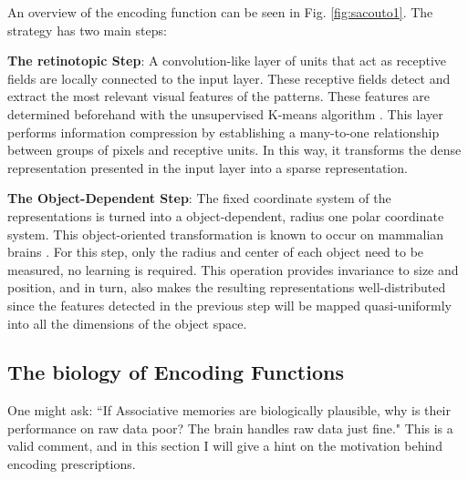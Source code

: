\documentclass[runningheads]{llncs}
\begin{document}
An overview of the encoding function can be seen in Fig. \ref{fig:sacouto1}. The strategy has two main steps:

\textbf{The retinotopic Step}: A convolution-like layer \cite{lecun1995convolutional} of units that act as receptive fields are locally connected to the input layer. These receptive fields detect and extract the most relevant visual features of the patterns. These features are determined beforehand with the unsupervised K-means algorithm \cite{lloyd1982least,wu2008top}. This layer performs information compression by establishing a many-to-one relationship between groups of pixels and receptive units. In this way, it transforms the dense representation presented in the input layer into a sparse representation.

\textbf{The Object-Dependent Step}: The fixed coordinate system of the representations is turned into a object-dependent, radius one polar coordinate system. This object-oriented transformation is known to occur on mammalian brains \cite{chafee2007representing}. For this step, only the radius and center of each object need to be measured, no learning is required. This operation provides invariance to size and position, and in turn, also makes the resulting representations well-distributed since the features detected in the previous step will be mapped quasi-uniformly into all the dimensions of the object space. 

\subsection{The biology of Encoding Functions}
\label{sec:prescriptions_bio}
One might ask: ``If Associative memories are biologically plausible, why is their performance on raw data poor? The brain handles raw data just fine." This is a valid comment, and in this section I will give a hint on the motivation behind encoding prescriptions.
\end{document}
